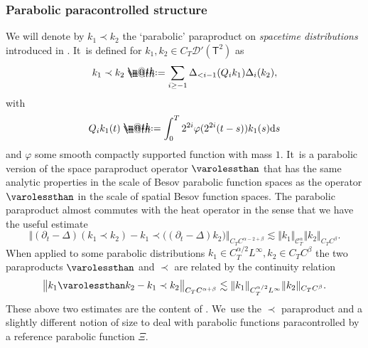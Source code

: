 \documentclass[JEP,XML,SOM,Unicode,published]{cedram}
\makeatletter
\theoremstyle{definition}
\newcommand{\mcD}{\mathcal{D}}
\newcommand{\scrC}{\ensuremath{\mathscr{C}}}
\newcommand*{\defeq}{\mathrel{\rlap{%
\raisebox{0.3ex}{$\m@th\cdot$}}%
\raisebox{-0.3ex}{$\m@th\cdot$}}%
=}
\newcommand{\dd}{\textup{d}}
\newcommand{\norme}[1]{\Vert #1 \Vert}
\makeatother
\begin{document}
\subsubsection{Parabolic paracontrolled structure} We will denote by $k_1\prec k_2$ the `parabolic' paraproduct on {\it spacetime distributions} introduced in \cite[\S5]{GIP}. It~is defined for $k_1,k_2\in C_T\mcD'(\mathsf{T}^2)$ as\vspace*{-3pt}
\[
k_1\prec k_2 \defeq \sum_{i\geq -1} \Delta_{<i-1}(Q_ik_1)\Delta_i(k_2),
\]
with\vspace*{-6pt}\enlargethispage{.5\baselineskip}
\[Q_ik_1(t) \defeq \int_0^T 2^{2i}\varphi(2^{2i}(t-s))k_1(s)\dd s
\]
and $\varphi$ some smooth compactly supported function with mass $1$. It~is a parabolic version of the space paraproduct operator $\varolessthan$ that has the same analytic properties in the scale of Besov parabolic function spaces as the operator $\varolessthan$ in the scale of spatial Besov function spaces. The parabolic paraproduct almost commutes with the heat operator in the sense that we have the useful estimate\vspace*{-3pt}
\[
\big\Vert (\partial_t-\Delta)(k_1\prec k_2) - k_1 \prec \bigl((\partial_t-\Delta)k_2\bigr)\big\Vert_{C_TC^{\alpha-2+\beta}} \lesssim \norme{k_1}_{\scrC^\alpha_T} \norme{k_2}_{C_TC^\beta}.
\]
When applied to some parabolic distributions $k_1\in C_T^{\alpha/2}L^\infty, k_2\in C_TC^\beta$ the two paraproducts $\varolessthan$ and $\prec$ are related by the continuity relation\vspace*{-3pt}
\begin{equation} \label{continuityrelation}
\big\Vert k_1\varolessthan k_2 - k_1 \prec k_2\big\Vert_{C_TC^{\alpha+\beta}} \lesssim \norme{k_1}_{C_T^{\alpha/2}L^\infty} \norme{k_2}_{C_TC^\beta}.
\end{equation}
These above two estimates are the content of \cite[Lem.\,5.1]{GIP}. We~use the $\prec$ paraproduct and a slightly different notion of size to deal with parabolic functions paracontrolled by a reference parabolic function $\Xi$.
\end{document}
